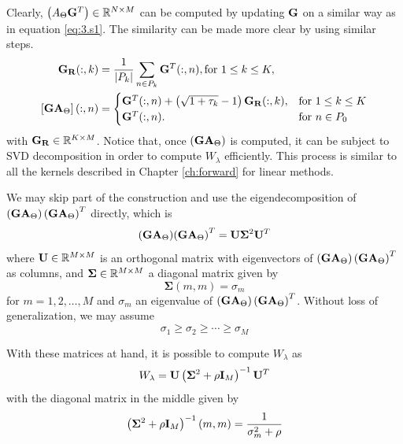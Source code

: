 Clearly, $\left( A_\Theta \mathbf{G}^T \right)\in \mathbb{R}^{N\times M}$ can be computed by updating $\mathbf{G}$ on a similar way as in equation \eqref{eq:3.s1}.
%
The similarity can be made more clear by using similar steps.
\begin{align}
    \mathbf{G}_{\mathbf{R}}(:,k) 
    &= 
    \frac{1}{\left| {P_k} \right|} \sum_{n \in P_k} \mathbf{G}^T(:, n), 
    \text{for } 1\leq k \leq K,
    \\
    \left[ \mathbf{G} \mathbf{A}_\Theta \right](:, n) 
    &=
    \begin{cases}
    \mathbf{G}^T(:,n) 
     + \left( \sqrt{1+\tau_k}-1 \right) \mathbf{G}_{\mathbf{R}}(:,k), &\text{for } 1\leq k \leq K \\
    \mathbf{G}^T(:,n).
    &\text{for } n\in P_0
    \end{cases}
\end{align}
with $\mathbf{G}_{\mathbf{R}} \in \mathbb{R}^{K\times M}$.
%
Notice that, once $\left( \mathbf{G} \mathbf{A}_\Theta \right)$ is computed, it can be subject to 
SVD decomposition in order to compute $W_\lambda$ efficiently.
%
This process is similar to all the kernels described in Chapter \ref{ch:forward} for linear methods.

We may skip part of the construction and use the eigendecomposition of $\left( {\mathbf{G} \mathbf{A}_\Theta} \right)\left( {\mathbf{G} \mathbf{A}_\Theta} \right)^T$ directly, which is 
\begin{equation}
    { \left( \mathbf{G}\mathbf{A}_\Theta \right) } { \left( \mathbf{G}\mathbf{A}_\Theta \right) }^T
    =
    \mathbf{U} \mathbf{\Sigma}^2 \mathbf{U}^T
\end{equation}
where $\mathbf{U}\in \mathbb{R}^{M\times M}$ is an orthogonal matrix with eigenvectors of $\left( {\mathbf{G} \mathbf{A}_\Theta} \right) \left( {\mathbf{G} \mathbf{A}_\Theta} \right)^T$ as columns, and $\mathbf{\Sigma}\in \mathbb{R}^{M\times M}$ a diagonal matrix given by
\begin{equation}
    \mathbf{\Sigma}(m,m) = \sigma_m
\end{equation}
for $m=1, 2, \dots, M$ and $\sigma_m$ an eigenvalue of 
$\left( {\mathbf{G} \mathbf{A}_\Theta} \right) \left( {\mathbf{G} \mathbf{A}_\Theta} \right)^T$.
%
Without loss of generalization, we may assume
\begin{equation}
    \sigma_1 \geq \sigma_2 \geq \cdots \geq \sigma_M
\end{equation}

With these matrices at hand, it is possible to compute $W_\lambda$ as
\begin{equation}
    W_\lambda = \mathbf{U} \left(  \mathbf{\Sigma}^2 + \rho \mathbf{I}_M \right)^{-1} \mathbf{U}^T
\end{equation}
with the diagonal matrix in the middle given by
\begin{equation}
    \left(  \mathbf{\Sigma}^2 + \rho \mathbf{I}_M \right)^{-1} (m,m) = \frac{1}{\sigma_m^2 + \rho}
\end{equation}

